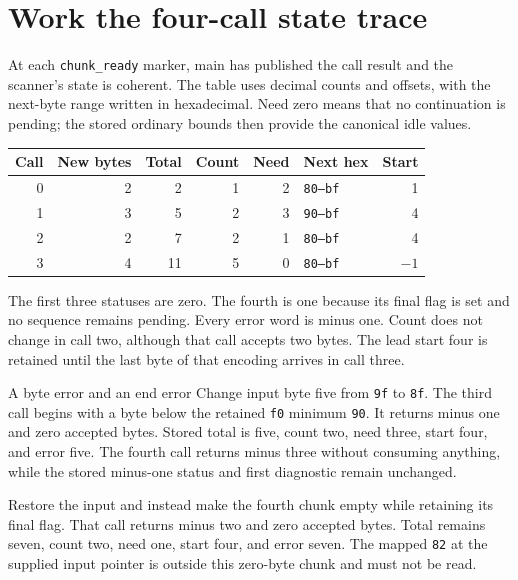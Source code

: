 \section{Work the four-call state trace}\label{utf8-x-trace}
At each \texttt{chunk\_ready} marker, main has published the call result and the
scanner's state is coherent. The table uses decimal counts and offsets, with the
next-byte range written in hexadecimal. Need zero means that no continuation is
pending; the stored ordinary bounds then provide the canonical idle values.

\begin{longtable}{rrrrrlr}
  \toprule Call & New bytes & Total & Count & Need & Next hex        & Start  \\\midrule
  0             & 2         & 2     & 1     & 2    & \texttt{80--bf} & 1      \\
  1             & 3         & 5     & 2     & 3    & \texttt{90--bf} & 4      \\
  2             & 2         & 7     & 2     & 1    & \texttt{80--bf} & 4      \\
  3             & 4         & 11    & 5     & 0    & \texttt{80--bf} & \(-1\) \\\bottomrule
\end{longtable}
The first three statuses are zero. The fourth is one because its final flag is
set and no sequence remains pending. Every error word is minus one. Count does not
change in call two, although that call accepts two bytes. The lead start four is
retained until the last byte of that encoding arrives in call three.

\begin{MARSWorkedExample}{A byte error and an end error}
  Change input byte five from \texttt{9f} to \texttt{8f}. The third call begins with a
  byte below the retained \texttt{f0} minimum \texttt{90}. It returns minus one and
  zero accepted bytes. Stored total is five, count two, need three, start four, and
  error five. The fourth call returns minus three without consuming anything, while
  the stored minus-one status and first diagnostic remain unchanged.

  Restore the input and instead make the fourth chunk empty while retaining its
  final flag. That call returns minus two and zero accepted bytes. Total remains
  seven, count two, need one, start four, and error seven. The mapped \texttt{82} at
  the supplied input pointer is outside this zero-byte chunk and must not be read.
\end{MARSWorkedExample}
